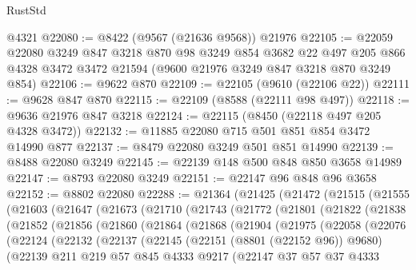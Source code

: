 \begin{lexlean}{RustStd}
\begin{coremodule}
    @4321
@22080 := @8422 (@9567 (@21636 @9568)) @21976
@22105 := @22059
    @22080
    @3249
    @847
    @3218
    @870
    @98
    @3249
    @854
    @3682
    @22
    @497
    @205
    @866
    @4328
    @3472
    @3472
    @21594
    (@9600 @21976 @3249 @847 @3218 @870 @3249 @854)
@22106 := @9622 @870
@22109 := @22105 (@9610 (@22106 @22))
@22111 := @9628 @847 @870
@22115 := @22109 (@8588 (@22111 @98 @497))
@22118 := @9636 @21976 @847 @3218
@22124 := @22115 (@8450 (@22118 @497 @205 @4328 @3472))
@22132 := @11885 @22080 @715 @501 @851 @854 @3472 @14990 @877
@22137 := @8479 @22080 @3249 @501 @851 @14990
@22139 := @8488 @22080 @3249
@22145 := @22139 @148 @500 @848 @850 @3658 @14989
@22147 := @8793 @22080 @3249
@22151 := @22147 @96 @848 @96 @3658
@22152 := @8802 @22080
@22288 := @21364
    (@21425
      (@21472
        (@21515
          (@21555
            (@21603
              (@21647
                (@21673
                  (@21710
                    (@21743
                      (@21772
                        (@21801
                          (@21822
                            (@21838
                              (@21852
                                (@21856
                                  (@21860
                                    (@21864
                                      (@21868
                                        (@21904
                                          (@21975
                                            (@22058
                                              (@22076
                                                (@22124
                                                  (@22132
                                                    (@22137
                                                      (@22145
                                                        (@22151 (@8801 (@22152 @96)) @9680)
                                                        (@22139
                                                          @211
                                                          @219
                                                          @57
                                                          @845
                                                          @4333
                                                          @9217
                                                          (@22147
                                                            @37
                                                            @57
                                                            @37
                                                            @4333

\end{coremodule}
\end{lexlean}
